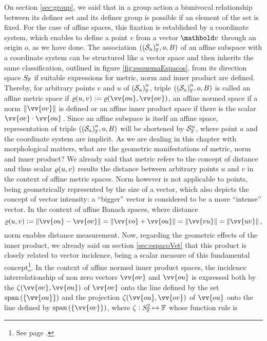 On section \ref{sec:group}, we said that in a group action a biunivocal relationship between its definer set and its definer group is possible if an element of the set is fixed. For the case of affine spaces, this fixation is established by a coordinate system, which enables to define a point $v$ from a vector $\vto{v}$ through an origin $o$, as we have done. The association $(\eamsd{S}{F}{a}{n},o,B)$ of an affine subspace with a coordinate system can be structured like a vector space and then inherits the same classification, outlined in figure \ref{fig:esquemaEspacos}, from its direction space $S_\cam{F}$ if suitable expressions for metric, norm and inner product are defined. Thereby, for arbitrary points $v$ and $u$ of $\eamsd{S}{F}{a}{n}$, triple $(\eamsd{S}{F}{a}{n},o,B)$ is called an affine metric space if $\fua{\varrho}{u,v}:=\fua{\varrho}{\vv{ou},\vv{ov}}$, an affine normed space if a norm $\|\vv{ov}\|$ is defined or an affine inner product space if there is the scalar $\vv{ov}\cdot\vv{ou}\,$. Since an affine subspace is itself an affine space, representation of triple $(\eamsd{S}{F}{a}{n},o,B)$ will be shortened by $\eamd{S}{F}{n}$, where point $a$ and the coordinate system are implicit. As we are dealing in this chapter with morphological matters, what are the geometric manifestations of metric, norm and inner product? We already said that metric refers to the concept of distance and thus scalar $\fua{\varrho}{u,v}$ results the distance between arbitrary points $u$ and $v$ in the context of affine metric spaces. Norm however is not applicable to points, being geometrically represented by the size of a vector, which also depicts the concept of vector intensity: a ``bigger'' vector is considered to be a more ``intense'' vector. In the context of affine Banach spaces, where distance
\begin{equation}\label{eq:affDistance}
\fua{\varrho}{u,v} := \|\vv{ou} - \vv{ov}\|=\|\vv{vo} + \vv{ou}\|=\|\vv{vu}\|=\|\vv{uv}\|\,,
\end{equation}
norm enables distance measurement. Now, regarding the geometric effects of the inner product, we already said on section \ref{sec:espacoVet} that this product is closely related to vector incidence, being a scalar measure of this fundamental concept\footnote{See page \pageref{sec:incidence}.}. In the context of affine normed inner product spaces, the incidence interrelationship of non zero vectors $\vv{ov}$ and $\vv{ou}$ is expressed both by the  $\fua{\zeta}{\vv{ov},\vv{ou}}$ of $\vv{ov}$ onto the line defined by the set $\spn{(\{\vv{ou}\})}$ and the projection $\fua{\zeta}{\vv{ou},\vv{ov}}$ of $\vv{ou}$ onto the line defined by $\spn{(\{\vv{ov}\})}$, where $\map{\zeta}{S_\cam{F}^2}{\cam{F}}$ whose function rule is
